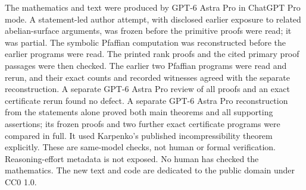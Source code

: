 \documentclass[11pt]{article}
\theoremstyle{definition}\newtheorem{definition}[theorem]{Definition}
\theoremstyle{remark}\newtheorem{remark}[theorem]{Remark}
\begin{document}
The mathematics and text were produced by GPT-6 Astra Pro in ChatGPT Pro mode. A statement-led author attempt, with disclosed earlier exposure to related abelian-surface arguments, was frozen before the primitive proofs were read; it was partial. The symbolic Pfaffian computation was reconstructed before the earlier programs were read. The printed rank proofs and the cited primary proof passages were then checked. The earlier two Pfaffian programs were read and rerun, and their exact counts and recorded witnesses agreed with the separate reconstruction. A separate GPT-6 Astra Pro review of all proofs and an exact certificate rerun found no defect. A separate GPT-6 Astra Pro reconstruction from the statements alone proved both main theorems and all supporting assertions; its frozen proofs and two further exact certificate programs were compared in full. It used Karpenko's published incompressibility theorem explicitly. These are same-model checks, not human or formal verification. Reasoning-effort metadata is not exposed. No human has checked the mathematics. The new text and code are dedicated to the public domain under CC0 1.0.
\end{document}
